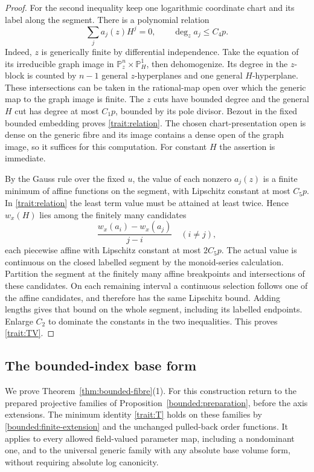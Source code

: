 \begin{proof}
For the second inequality keep one logarithmic
coordinate chart and its label along the segment.
There is a polynomial relation
\begin{equation}
 \sum_j a_j(z)H^j=0,\qquad \deg_z a_j\le C_4p.
 \label{trait:relation}
\end{equation}
Indeed, \(z\) is generically finite by differential
independence.  Take the equation of its irreducible
graph image in \(\mathbb P^n_z\times\mathbb P^1_H\),
then dehomogenize.  Its degree in the \(z\)-block
is counted by \(n-1\) general \(z\)-hyperplanes
and one general \(H\)-hyperplane.  These intersections
can be taken in the rational-map open over which
the generic map to the graph image is finite.  The
\(z\) cuts have bounded degree and the general
\(H\) cut has degree at most \(C_1p\), bounded by
its pole divisor.  Bezout in the fixed bounded
embedding proves \eqref{trait:relation}.  The chosen
chart-presentation open is dense on the generic
fibre and its image contains a dense open of the
graph image, so it suffices for this computation.
For constant \(H\) the assertion is immediate.

By the Gauss rule over the fixed \(u\), the value
of each nonzero \(a_j(z)\) is a finite minimum of
affine functions on the segment, with Lipschitz
constant at most \(C_5p\).  In \eqref{trait:relation}
the least term value must be attained at least
twice.  Hence \(w_x(H)\) lies among the finitely
many candidates
\[
 \frac{w_x(a_i)-w_x(a_j)}{j-i}\quad(i\ne j),
\]
each piecewise affine with Lipschitz constant at
most \(2C_5p\).  The actual value is continuous
on the closed labelled segment by the monoid-series
calculation.  Partition the segment at the finitely
many affine breakpoints and intersections of these
candidates.  On each remaining interval a
continuous selection follows one of the affine
candidates, and therefore has the same Lipschitz
bound.  Adding lengths gives that bound on the
whole segment, including its labelled endpoints.
Enlarge \(C_2\) to dominate the constants in the
two inequalities.  This proves \eqref{trait:TV}.
\end{proof}

\subsection{The bounded-index base form}

We prove Theorem~\ref{thm:bounded-fibre}(1).  For this construction
return to the prepared projective families of
Proposition~\ref{bounded:preparation}, before the axis extensions.
The minimum identity \eqref{trait:T} holds on these families by
\eqref{bounded:finite-extension} and the unchanged pulled-back order
functions.  It applies to every allowed field-valued parameter map,
including a nondominant one, and to the universal generic family with
any absolute base volume form, without requiring absolute log canonicity.

